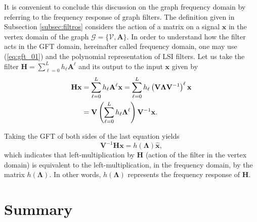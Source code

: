 
It is convenient to conclude this discussion on the graph frequency domain by referring to the frequency response of graph filters. The definition given in Subsection \ref{subsec:filtros} considers the action of a matrix on a signal $ \mathbf{x} $ in the vertex domain of the graph $ \mathcal{G} = \{\mathcal{V}, \mathbf{A}\} $. In order to understand how the filter acts in the GFT domain, hereinafter called frequency domain, one may use (\ref{eq:gft_01}) and the polynomial representation of LSI filters. Let us take the filter $ \mathbf{H} =\sum_{\ell=0}^{L} h_\ell \mathbf{A}^\ell $ and its output to the input $ \mathbf{x} $ given by
\begin{align}\label{eq:resposta_freq_01}
\mathbf{H} \mathbf{x} &= \sum_{\ell=0}^{L} h_\ell \mathbf{A}^\ell \mathbf{x} =
\sum_{\ell=0}^{L} h_\ell \left(\mathbf{V} \mathbf{\Lambda} \mathbf{V}^{-1}\right)^\ell \mathbf{x} \notag \\
&= \mathbf{V} \left(\sum_{\ell=0}^{L} h_\ell \mathbf{\Lambda}^\ell \right) \mathbf{V}^{-1} \mathbf{x}.
\end{align}

Taking the GFT of both sides of the last equation yields
\begin{equation}\label{eq:resposta_freq_02}
\mathbf{V}^{-1} \mathbf{H} \mathbf{x} =
h(\mathbf{\Lambda}) \widehat{\mathbf{x}},
\end{equation}
which indicates that left-multiplication by $ \mathbf{H} $ (action of the filter in the vertex domain) is equivalent to the left-multiplication, in the frequency domain, by the matrix $ h(\mathbf{\Lambda}) $. In other words, $ h(\mathbf{\Lambda}) $ represents the frequency response of $ \mathbf{H} $.

\section{Summary}

